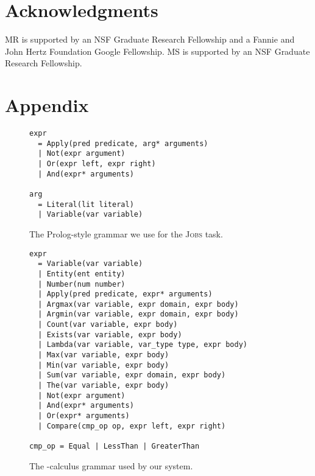 \documentclass[11pt,a4paper]{article}
\newcommand{\Jobs}{\textsc{Jobs}\xspace}
\begin{document}
\section*{Acknowledgments}

MR is supported by an NSF Graduate Research Fellowship and a Fannie and John Hertz Foundation Google Fellowship. MS is supported by an NSF Graduate Research Fellowship.




\appendix

\newpage 

\section{Appendix}

\begin{figure}[h]
\begin{minipage}[t]{0.5\linewidth}
\footnotesize
\begin{verbatim}
expr
  = Apply(pred predicate, arg* arguments)
  | Not(expr argument)
  | Or(expr left, expr right)
  | And(expr* arguments)

arg
  = Literal(lit literal)
  | Variable(var variable)
\end{verbatim}
\end{minipage}
\caption{The Prolog-style grammar we use for the \Jobs task. \label{fig:prolog-grammar}}
\end{figure}

\begin{figure}[h]
\begin{minipage}[t]{0.5\linewidth}
\footnotesize \begin{verbatim}
expr 
  = Variable(var variable)
  | Entity(ent entity)
  | Number(num number)
  | Apply(pred predicate, expr* arguments)
  | Argmax(var variable, expr domain, expr body)
  | Argmin(var variable, expr domain, expr body)
  | Count(var variable, expr body)
  | Exists(var variable, expr body)
  | Lambda(var variable, var_type type, expr body)
  | Max(var variable, expr body)
  | Min(var variable, expr body)
  | Sum(var variable, expr domain, expr body) 
  | The(var variable, expr body) 
  | Not(expr argument) 
  | And(expr* arguments) 
  | Or(expr* arguments) 
  | Compare(cmp_op op, expr left, expr right) 

cmp_op = Equal | LessThan | GreaterThan
\end{verbatim}
\end{minipage}
\caption{The -calculus grammar used by our system. \label{fig:lambda-grammar}}
\end{figure}
\end{document}
